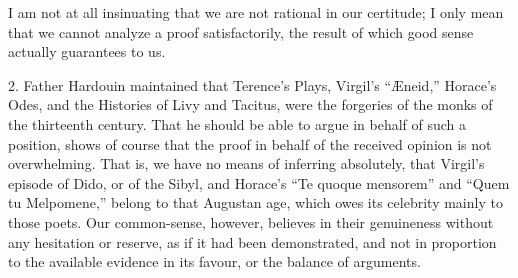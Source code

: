 I am not at all insinuating that we are not rational in our
certitude; I only mean that we cannot analyze a proof satisfactorily,
the result of which good sense actually guarantees to us.

2. Father Hardouin maintained that Terence's Plays, Virgil's ``Æneid,''
Horace's Odes, and the Histories of Livy and Tacitus, were the
forgeries of the monks of the thirteenth century. That he should be
able to argue in behalf of such a position, shows of course that the
proof in behalf of the received opinion is not overwhelming. That is,
we have no means of inferring absolutely, that Virgil's episode of
Dido, or of the Sibyl, and Horace's ``Te quoque mensorem'' and
``Quem tu Melpomene,'' belong to that Augustan age, which owes
its celebrity mainly to those poets. Our common-sense, however,
believes in their genuineness without any hesitation or reserve, as if
it had been demonstrated, and not in proportion to the available
evidence in its favour, or the balance of arguments.

